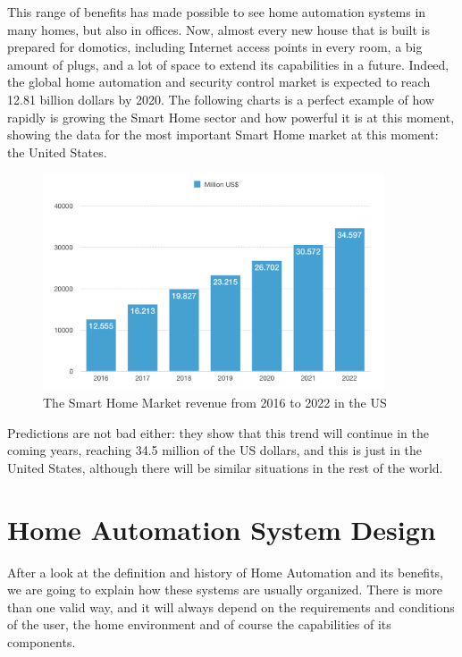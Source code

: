 This range of benefits has made possible to see home automation systems in many homes, but also in offices. Now, almost
every new house that is built is prepared for domotics, including Internet access points in every room, a big amount of plugs,
and a lot of space to extend its capabilities in a future. Indeed, the global home automation and security control market is
expected to reach 12.81 billion dollars by 2020.\cite{reutersResearchMarkets} The following charts is a perfect example of how
rapidly is growing the Smart Home sector and how powerful it is at this moment, showing the data for the most important Smart
Home market at this moment: the United States.

\begin{figure}
	\centering
	\includegraphics[width=0.9\textwidth]{images/Chapter_03/sh-market-revenue.png}
	\caption{The Smart Home Market revenue from 2016 to 2022 in the US\cite{statistaSmartHomeUS}}
	\label{fig:sh-market-revenue}
\end{figure}

Predictions are not bad either: they show that this trend will continue in the coming years, reaching 34.5 million of the
US dollars, and this is just in the United States, although there will be similar situations in the rest of the world.

\bigskip
\section{Home Automation System Design}
After a look at the definition and history of Home Automation and its benefits, we are going to explain how these systems are
usually organized. There is more than one valid way, and it will always depend on the requirements and conditions of the user,
the home environment and of course the capabilities of its components.

